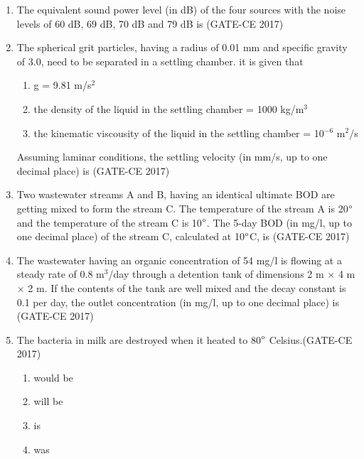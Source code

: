 \documentclass[journal,12pt,onecolumn]{article}
\theoremstyle{remark}
\begin{document}
\begin{enumerate}
    \item The equivalent sound power level (in dB) of the four sources with the noise levels of 60 dB, 69 dB, 70 dB and 79 dB is \underline{\hspace{3cm}}\hfill (GATE-CE 2017)

    \item The spherical grit particles, having a radius of 0.01 mm and specific gravity of 3.0, need to be separated in a settling chamber.
    it is given that
    \begin{enumerate}
        \item g = 9.81 m/s$^2$
        \item the density of the liquid in the settling chamber = 1000 kg/m$^3$
        \item the kinematic viscousity of the liquid in the settling chamber = 10$^{-6}$ m$^2$/s
    \end{enumerate}
    Assuming laminar conditions, the settling velocity (in mm/s, up to one decimal place) is \underline{\hspace{3cm}}\hfill (GATE-CE 2017)

    \item Two wastewater streams A and B, having an identical ultimate BOD are getting mixed to form the stream C. The temperature of the stream A is 20$\degree$ and the temperature of the stream C is 10$\degree$. The 5-day BOD (in mg/l, up to one decimal place) of the stream C, calculated at 10$\degree$C, is \underline{\hspace{3cm}}\hfill (GATE-CE 2017)

    \item The wastewater having an organic concentration of 54 mg/l is flowing at a steady rate of 0.8 m$^3$/day through a detention tank of dimensions 2 m $\times$ 4 m $\times$ 2 m. If the contents of the tank are well mixed and the decay constant is 0.1 per day, the outlet concentration (in mg/l, up to one decimal place) is \underline{\hspace{3cm}}\hfill (GATE-CE 2017)

    \item The bacteria in milk are destroyed when it \underline{\hspace{3cm}} heated to 80$\degree$ Celsius.\hfill (GATE-CE 2017)
    \begin{multicols}{4}
    \begin{enumerate}
        \item would be
        \item will be
        \item is
        \item was
    \end{enumerate}
    \end{multicols}


\end{enumerate}
\end{document}
